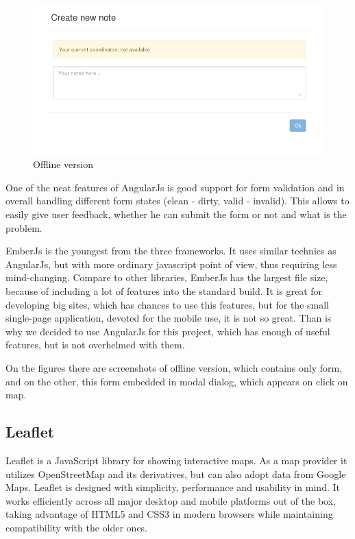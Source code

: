 \documentclass[12pt,a4paper]{article}
\begin{document}
    \begin{figure}[h]
      \begin{center}
        \includegraphics[width=\textwidth]{res/offline}
      \end{center}
      \caption{Offline version}
    \end{figure}

One of the neat features of AngularJs is good support for form validation and in overall
handling different form states (clean - dirty, valid - invalid). This allows to
easily give user feedback, whether he can submit the form or not and what is the problem.

EmberJs is the youngest from the three frameworks. It uses similar technics
as AngularJs, but with more ordinary javascript point of view, thus requiring
less mind-changing. Compare to other libraries, EmberJs has the largest file size,
because of including a lot of features into the standard build. It is great for
developing big sites, which has chances to use this features, but for the small
single-page application, devoted for the mobile use, it is not so great. Than is
why we decided to use AngularJs for this project, which has enough of useful
features, but is not overhelmed with them.

On the figures there are screenshots of offline version, which contains only form,
and on the other, this form embedded in modal dialog, which appears on click on map.

\subsection{Leaflet}

Leaflet is a JavaScript library for showing interactive maps. As a map
provider it utilizes OpenStreetMap and its derivatives, but can also
adopt data from Google Maps. Leaflet is designed with simplicity,
performance and usability in mind. It works efficiently across all
major desktop and mobile platforms out of the box, taking advantage of
HTML5 and CSS3 in modern browsers while maintaining compatibility with
the older ones.
\end{document}
